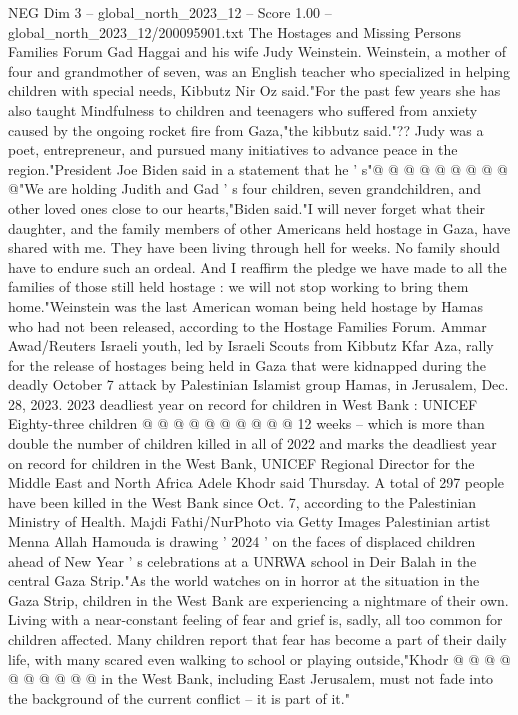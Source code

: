 \begin{textsample}{NEG Dim 3 – global\_north\_2023\_12 – Score 1.00 – global\_north\_2023\_12/200095901.txt}
The Hostages and Missing Persons Families Forum Gad Haggai and his wife Judy Weinstein.
Weinstein, a mother of four and grandmother of seven, was an English teacher who specialized in helping children with special needs, Kibbutz Nir Oz said."For the past few years she has also taught Mindfulness to children and teenagers who suffered from anxiety caused by the ongoing rocket fire from Gaza,"the kibbutz said."??
Judy was a poet, entrepreneur, and pursued many initiatives to advance peace in the region."President Joe Biden said in a statement that he ' s"@ @ @ @ @ @ @ @ @ @"We are holding Judith and Gad ' s four children, seven grandchildren, and other loved ones close to our hearts,"Biden said."I will never forget what their daughter, and the family members of other Americans held hostage in Gaza, have shared with me.
They have been living through hell for weeks.
No family should have to endure such an ordeal.
And I reaffirm the pledge we have made to all the families of those still held hostage : we will not stop working to bring them home."Weinstein was the last American woman being held hostage by Hamas who had not been released, according to the Hostage Families Forum.
Ammar Awad/Reuters Israeli youth, led by Israeli Scouts from Kibbutz Kfar Aza, rally for the release of hostages being held in Gaza that were kidnapped during the deadly October 7 attack by Palestinian Islamist group Hamas, in Jerusalem, Dec. 28, 2023. 2023 deadliest year on record for children in West Bank : UNICEF Eighty-three children @ @ @ @ @ @ @ @ @ @ 12 weeks -- which is more than double the number of children killed in all of 2022 and marks the deadliest year on record for children in the West Bank, UNICEF Regional Director for the Middle East and North Africa Adele Khodr said Thursday.
A total of 297 people have been killed in the West Bank since Oct. 7, according to the Palestinian Ministry of Health.
Majdi Fathi/NurPhoto via Getty Images Palestinian artist Menna Allah Hamouda is drawing ' 2024 ' on the faces of displaced children ahead of New Year ' s celebrations at a UNRWA school in Deir Balah in the central Gaza Strip."As the world watches on in horror at the situation in the Gaza Strip, children in the West Bank are experiencing a nightmare of their own.
Living with a near-constant feeling of fear and grief is, sadly, all too common for children affected.
Many children report that fear has become a part of their daily life, with many scared even walking to school or playing outside,"Khodr @ @ @ @ @ @ @ @ @ @ in the West Bank, including East Jerusalem, must not fade into the background of the current conflict -- it is part of it."

\end{textsample}
